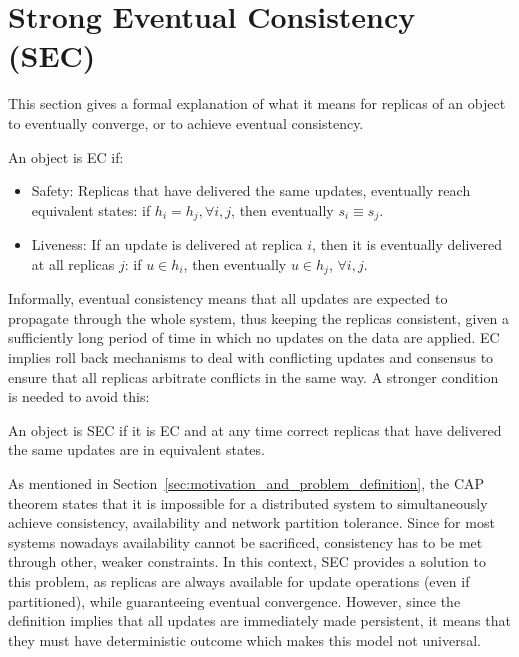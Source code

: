 \section{Strong Eventual Consistency (SEC)}
\label{sec:strong_eventual_consistency}

This section gives a formal explanation of what it means for replicas of an
object to eventually converge, or to achieve eventual consistency.

\begin{definition}
\begin{itshape}
An object is EC if:
\begin{itemize}
  \item Safety: Replicas that have delivered the same updates, eventually
  reach equivalent states: if $h_{i} = h_{j}, \forall i,j$, then eventually
  $s_{i} \equiv s_{j}$.
  \item Liveness: If an update is delivered at replica $i$, then it is  
  eventually delivered at all replicas $j$: if $u \in h_{i}$, then
  eventually $u \in h_{j}$, $\forall i,j$.
\end{itemize}
\end{itshape}
\end{definition}

Informally, eventual consistency means that all updates are expected to
propagate through the whole system, thus keeping the replicas consistent, given
a sufficiently long period of time in which no updates on the data are applied.
EC implies roll back mechanisms to deal with conflicting updates and consensus
to ensure that all replicas arbitrate conflicts in the same way. A stronger
condition is needed to avoid this:

\begin{definition}
\begin{itshape}
An object is SEC if it is EC and at any time correct replicas that have
delivered the same updates are in equivalent states. 
\end{itshape}
\end{definition}

As mentioned in Section~\ref{sec:motivation_and_problem_definition}, the CAP
theorem states that it is impossible for a distributed system to
simultaneously achieve consistency, availability and network partition
tolerance. Since for most systems nowadays availability cannot be sacrificed,
consistency has to be met through other, weaker constraints. In this context,
SEC provides a solution to this problem, as replicas are always available for
update operations (even if partitioned), while guaranteeing eventual
convergence. However, since the definition implies that all updates are
immediately made persistent, it means that they must have deterministic outcome
which makes this model not universal.

